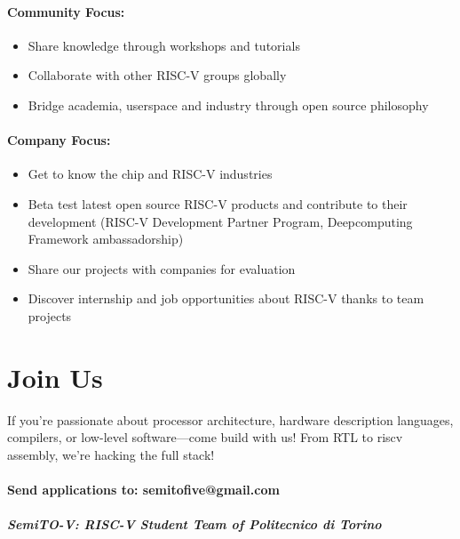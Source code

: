 \documentclass{article}
\begin{document}
\paragraph{Community Focus:}

\begin{itemize}
    \item Share knowledge through workshops and tutorials
    \item Collaborate with other RISC-V groups globally
    \item Bridge academia, userspace and industry through open source philosophy
\end{itemize}

\paragraph{Company Focus:}

\begin{itemize}
    \item Get to know the chip and RISC-V industries
    \item Beta test latest open source RISC-V products and contribute to their development (RISC-V Development Partner Program, Deepcomputing Framework ambassadorship)
    \item Share our projects with companies for evaluation
    \item Discover internship and job opportunities about RISC-V thanks to team projects
\end{itemize}

\section{Join Us}

If you're passionate about processor architecture, hardware description languages, compilers, or low-level software—come build with us! From RTL to riscv assembly, we're hacking the full stack!

\paragraph{Send applications to: semitofive@gmail.com}

\subparagraph{\textit{SemiTO-V: RISC-V Student Team of Politecnico di Torino}}
\end{document}
